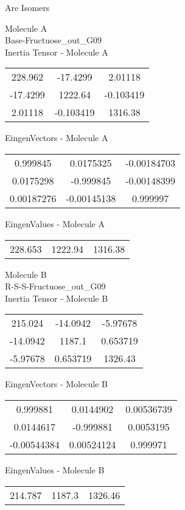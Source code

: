 \begin{center}
\vtab
\vtab
\textcolor{NavyBlue}{\Large Are Isomers}
\end{center}
\newpage
\begin{multicols}{2}
\begin{center}
Molecule A \\ 
Base-Fructuose\_out\_G09
\\
Inertia Tensor - Molecule A \\
\vtab
\begin{tabular}{|c c c|}
228.962	 & 	-17.4299	 & 	2.01118	 \\
-17.4299	 & 	1222.64	 & 	-0.103419	 \\
2.01118	 & 	-0.103419	 & 	1316.38
\end{tabular}

\vtab
 EingenVectors - Molecule A     \\
\vtab
\begin{tabular}{|c c c|}
0.999845	 & 	0.0175325	 & 	-0.00184703	 \\
0.0175298	 & 	-0.999845	 & 	-0.00148399	 \\
0.00187276	 & 	-0.00145138	 & 	0.999997
\end{tabular}

\vtab
 EingenValues - Molecule A     \\
\vtab
\begin{tabular}{|c c c|}
228.653	 & 	1222.94	 & 	1316.38
\end{tabular}
\columnbreak

Molecule B \\ 
R-S-S-Fructuose\_out\_G09
\\
Inertia Tensor - Molecule B \\
\vtab
\begin{tabular}{|c c c|}
215.024	 & 	-14.0942	 & 	-5.97678	 \\
-14.0942	 & 	1187.1	 & 	0.653719	 \\
-5.97678	 & 	0.653719	 & 	1326.43
\end{tabular}

\vtab
 EingenVectors - Molecule B     \\
\vtab
\begin{tabular}{|c c c|}
0.999881	 & 	0.0144902	 & 	0.00536739	 \\
0.0144617	 & 	-0.999881	 & 	0.0053195	 \\
-0.00544384	 & 	0.00524124	 & 	0.999971
\end{tabular}

\vtab
 EingenValues - Molecule B     \\
\vtab
\begin{tabular}{|c c c|}
214.787	 & 	1187.3	 & 	1326.46
\end{tabular}

\end{center}
\end{multicols}
